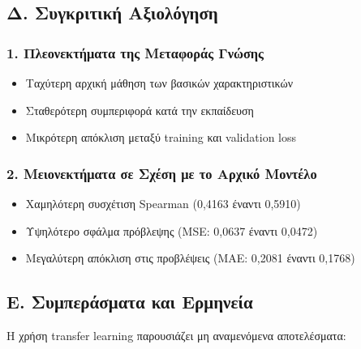 \documentclass[a4paper,12pt]{article}
\begin{document}
\subsection*{Δ. Συγκριτική Αξιολόγηση}

\subsubsection*{1. Πλεονεκτήματα της Μεταφοράς Γνώσης}
\begin{itemize}
    \item Ταχύτερη αρχική μάθηση των βασικών χαρακτηριστικών
    \item Σταθερότερη συμπεριφορά κατά την εκπαίδευση
    \item Μικρότερη απόκλιση μεταξύ training και validation loss
\end{itemize}

\subsubsection*{2. Μειονεκτήματα σε Σχέση με το Αρχικό Μοντέλο}
\begin{itemize}
    \item Χαμηλότερη συσχέτιση Spearman (0,4163 έναντι 0,5910)
    \item Υψηλότερο σφάλμα πρόβλεψης (MSE: 0,0637 έναντι 0,0472)
    \item Μεγαλύτερη απόκλιση στις προβλέψεις (MAE: 0,2081 έναντι 0,1768)
\end{itemize}

\subsection*{Ε. Συμπεράσματα και Ερμηνεία}

Η χρήση transfer learning παρουσιάζει μη αναμενόμενα αποτελέσματα:
\end{document}
